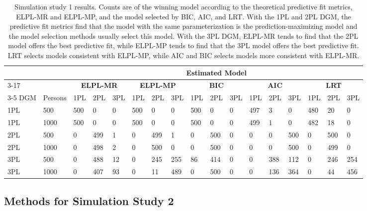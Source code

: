 \documentclass[
  english,
  man,floatsintext]{apa7}
\begin{document}
\setlength{\tabcolsep}{2pt}
\begin{table}
\caption{Simulation study 1 results. Counts are of the winning model according to the theoretical predictive fit metrics, ELPL-MR and ELPL-MP, and the model selected by BIC, AIC, and LRT. With the 1PL and 2PL DGM, the predictive fit metrics find that the model with the same parameterization is the prediction-maximizing model and the model selection methods usually select this model. With the 3PL DGM, ELPL-MR tends to find that the 2PL model offers the best predictive fit, while ELPL-MP tends to find that the 3PL model offers the best predictive fit. LRT selects models consistent with ELPL-MP, while AIC and BIC selects models more consistent with ELPL-MR.}
\centering
\begin{small}
\begin{tabular}{@{\extracolsep{2pt}}lllllllllllllllll}
\hline
&&\multicolumn{15}{c}{\textbf{Estimated Model}} \\ \cmidrule{3-17}
\multirow{2}{*}{} &
    &
    \multicolumn{3}{c}{\textbf{ELPL-MR}} &
    \multicolumn{3}{c}{\textbf{ELPL-MP}} &
    \multicolumn{3}{c}{\textbf{BIC}} &
    \multicolumn{3}{c}{\textbf{AIC}} &
    \multicolumn{3}{c}{\textbf{LRT}} \\
    \cmidrule{3-5} \cmidrule{6-8} \cmidrule{9-11} \cmidrule{12-14} \cmidrule{15-17}
DGM & Persons & 1PL & 2PL & 3PL & 1PL & 2PL & 3PL & 1PL & 2PL & 3PL & 1PL & 2PL & 3PL & 1PL & 2PL & 3PL  \\
\hline
1PL & 500 & 500 & 0 & 0 & 500 & 0 & 0 & 500 & 0 & 0 & 497 & 3 & 0 & 480 & 20 & 0   \\
1PL & 1000 & 500 & 0 & 0 & 500 & 0 & 0 & 500 & 0 & 0 & 499 & 1 & 0 & 482 & 18 & 0 \\
2PL & 500 & 0 & 499 & 1 & 0 & 499 & 1 & 0 & 500 & 0 & 0 & 0 & 500 & 0 & 500 & 0\\
2PL & 1000 & 0 & 498 & 2 & 0 & 500 & 0 & 0 & 500 & 0 & 0 & 0 & 500 & 0 & 499 & 0 \\
3PL & 500 & 0 & 488 & 12 & 0 & 245 & 255 & 86 & 414 & 0 & 0 & 388 & 112 & 0 & 246 & 254\\
3PL & 1000 & 0 & 407 & 93 & 0 & 11 & 489 & 0 & 500 & 0 & 0 & 136 & 364 & 0 & 44 & 456\\
\hline
\end{tabular}
\end{small}
\label{tab:results1}
\end{table}

\hypertarget{methods-for-simulation-study-2}{%
\subsection{Methods for Simulation Study 2}\label{methods-for-simulation-study-2}}
\end{document}
